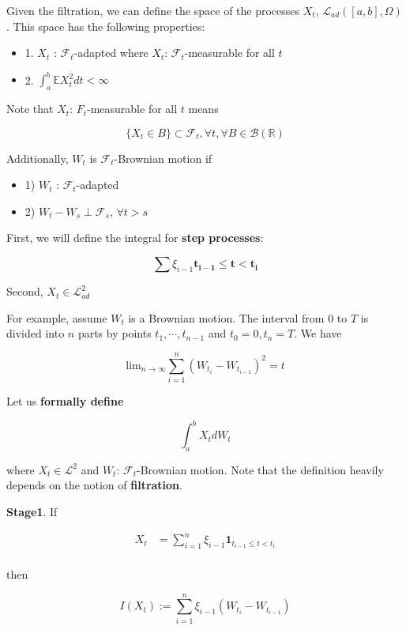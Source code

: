 \documentclass[12pt]{article}
\theoremstyle{nonumberbreak}
\begin{document}
Given the filtration, we can define the space of the processes $X_t$, $\mathcal{L}_{ad} \left( [a,b], \Omega \right)$. This space has the following properties:

\begin{itemize}
	\item 1. $X_t$ : $\mathcal{F}_t$-adapted where $X_t$: $\mathcal{F}_t$-measurable for all $t$
	\item 2. $\int_a^b \mathbb{E}X_t^2 dt < \infty $
\end{itemize}

Note that $X_t$: $F_t$-measurable for all $t$ means

$$
\{ X_t \in B\} \subset \mathcal{F}_t, \forall t, \forall B \in \mathcal{B}(\mathbb{R})
$$

Additionally, $W_t$ is $\mathcal{F}_t$-Brownian motion if 

\begin{itemize}
	\item 1) $W_t$ : $\mathcal{F}_t$-adapted
	\item 2) $W_t - W_s \perp \mathcal{F}_s$, $\forall t > s$
\end{itemize}

First, we will define the integral for \textbf{step processes}: 

$$
\sum \xi_{i-1} \mathbf{t_{i-1} \le t < t_i}
$$

Second, $X_t \in \mathcal{L}^2_{ad}$


For example, assume $W_t$ is a Brownian motion. The interval from $0$ to $T$ is divided into $n$ parts by points $t_1,\cdots,t_{n-1}$ and $t_0=0,t_n=T$. We have

$$
\mathrm{lim}_{n\to\infty} \sum_{i=1}^n \left( W_{t_i} - W_{t_{i-1}} \right)^2 = t
$$


Let us \textbf{formally define} 

$$
\int_a^b X_t dW_t
$$

where $X_t \in \mathcal{L}^2$ and $W_t$: $\mathcal{F}_t$-Brownian motion. Note that the definition heavily depends on the notion of \textbf{filtration}. 

\textbf{Stage1}. If

$$
\begin{aligned}
X_t &= \sum_{i=1}^n \xi_{i-1} \mathbf{1}_{t_{i-1} \le t < t_i} \\[8pt]
\end{aligned}
$$

then

$$
I (X_t) := \sum_{i=1}^n \xi_{i-1} \left( W_{t_i} - W_{t_{i-1}} \right)
$$
\end{document}
